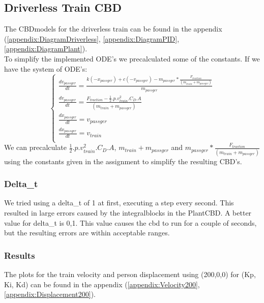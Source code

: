 \documentclass{article}
\begin{document}
\subsection{Driverless Train CBD}
The CBDmodels for the driverless train can be found in the appendix (\ref{appendix:DiagramDriverless}, \ref{appendix:DiagramPID}, \ref{appendix:DiagramPlant}).
\\To simplify the implemented ODE's we precalculated some of the constants. If we have the system of ODE's:
\[
\begin{cases}
	\frac{dv_{passger}}{dt} = \frac{k(-x_{passger})+c(-v_{passger})-m_{passger}*\frac{F_{traction}}{(m_{train}+m_{passger})}}{m_{passger}}\\
    \frac{dv_{passger}}{dt} = \frac{F_{traction}-\frac{1}{2}.p.v^2_{train}.C_D.A}{(m_{train}+m_{passger})}\\
    \frac{dx_{passger}}{dt} = v_{passger}\\
    \frac{dx_{passger}}{dt} = v_{train}\\
\end{cases}
\]
We can precalculate \(\frac{1}{2}.p.v^2_{train}.C_D.A\), \(m_{train}+m_{passger}\) and \(m_{passger}*\frac{F_{traction}}{(m_{train}+m_{passger})}\) using the constants given in the assignment to simplify the resulting CBD's.
\subsubsection{Delta\_t}
We tried using a delta\_t of 1 at first, executing a step every second. This resulted in large errors caused by the integralblocks in the PlantCBD. A better value for delta\_t is 0,1. This value causes the cbd to run for a couple of seconds, but the resulting errors are within acceptable ranges.
\subsubsection{Results}
The plots for the train velocity and person displacement using (200,0,0) for (Kp, Ki, Kd) can be found in the appendix (\ref{appendix:Velocity200}, \ref{appendix:Displacement200}).
\pagebreak
\end{document}
